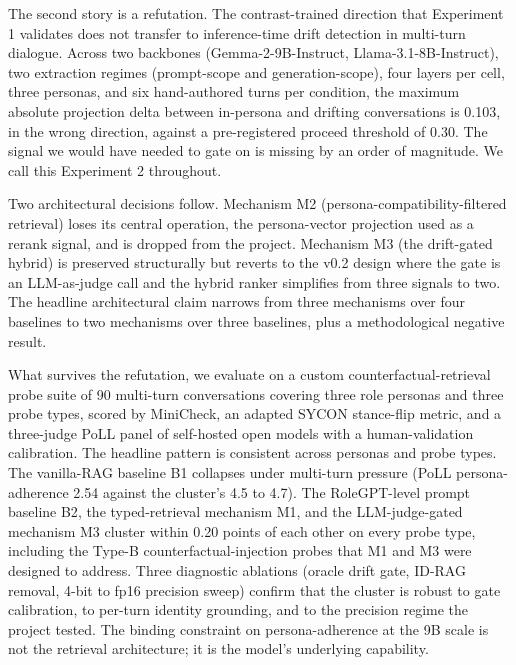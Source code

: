 The second story is a refutation. The contrast-trained direction that Experiment 1 validates does not transfer to inference-time drift detection in multi-turn dialogue. Across two backbones (Gemma-2-9B-Instruct, Llama-3.1-8B-Instruct), two extraction regimes (prompt-scope and generation-scope), four layers per cell, three personas, and six hand-authored turns per condition, the maximum absolute projection delta between in-persona and drifting conversations is 0.103, in the wrong direction, against a pre-registered proceed threshold of 0.30. The signal we would have needed to gate on is missing by an order of magnitude. We call this Experiment 2 throughout.

Two architectural decisions follow. Mechanism M2 (persona-compatibility-filtered retrieval) loses its central operation, the persona-vector projection used as a rerank signal, and is dropped from the project. Mechanism M3 (the drift-gated hybrid) is preserved structurally but reverts to the v0.2 design where the gate is an LLM-as-judge call and the hybrid ranker simplifies from three signals to two. The headline architectural claim narrows from three mechanisms over four baselines to two mechanisms over three baselines, plus a methodological negative result.

What survives the refutation, we evaluate on a custom counterfactual-retrieval probe suite of 90 multi-turn conversations covering three role personas and three probe types, scored by MiniCheck\autocite{minicheck2024}, an adapted SYCON stance-flip metric\autocite{sycon2025}, and a three-judge PoLL panel\autocite{poll2024} of self-hosted open models with a human-validation calibration. The headline pattern is consistent across personas and probe types. The vanilla-RAG baseline B1 collapses under multi-turn pressure (PoLL persona-adherence 2.54 against the cluster's 4.5 to 4.7). The RoleGPT-level prompt baseline B2\autocite{rolegpt2023, rolellm2023}, the typed-retrieval mechanism M1, and the LLM-judge-gated mechanism M3 cluster within 0.20 points of each other on every probe type, including the Type-B counterfactual-injection probes that M1 and M3 were designed to address. Three diagnostic ablations (oracle drift gate, ID-RAG removal, 4-bit to fp16 precision sweep) confirm that the cluster is robust to gate calibration, to per-turn identity grounding, and to the precision regime the project tested. The binding constraint on persona-adherence at the 9B scale is not the retrieval architecture; it is the model's underlying capability.

